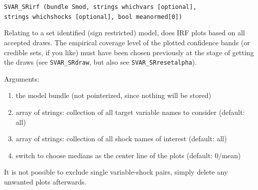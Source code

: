 \documentclass[a4paper,10pt]{article}
\newenvironment{funcdoc}[1]
{\noindent\hrulefill\newline\nopagebreak\texttt{#1}%
\nopagebreak\par\noindent\hrulefill%
\nopagebreak\par\nopagebreak\smallskip\nopagebreak\par}
{\bigskip}
\begin{document}
\begin{funcdoc}{SVAR\_SRirf (bundle Smod, strings whichvars [optional], \\
      strings whichshocks [optional], bool meanormed[0])}
\noindent Relating to a set identified (sign restricted) model, does IRF plots
 based on all accepted draws. The empirical coverage level of the plotted
 confidence bands (or credible sets, if you like) must have been chosen
 previously at the stage of getting the draws (see 
 \texttt{SVAR\_SRdraw}, but also see \texttt{SVAR\_SRresetalpha}).%

\noindent Arguments:

\begin{enumerate}
  \item the model bundle (not pointerized, since nothing will be stored)
  \item array of strings: collection of all target variable names to consider (default: all)
  \item array of strings: collection of all shock names of interest (default: all)
  \item switch to choose medians as the center line of the plots (default: 0/mean)
 \end{enumerate}
 It is not possible to exclude single variable-shock pairs, simply delete any unwanted plots afterwards. 
\end{funcdoc}
\end{document}
